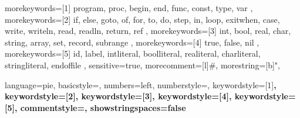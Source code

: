 {
    morekeywords={[1]
        program,
        proc,
        begin,
        end,
        func,
        const,
        type,
        var
    },
    morekeywords={[2]
        if,
        else,
        goto,
        of, %
        for,
        to, %
        do, %
        step, %
        in, %
        loop,
        exitwhen, %
        case,
        write,
        writeln,
        read,
        readln,
        return,
        ref
    },
    morekeywords={[3]
        int,
        bool,
        real,
        char,
        string,
        array,
        set,
        record,
        subrange
    },
    morekeywords={[4]
        true, false, nil
    },
    morekeywords={[5]
        id,
        label,
        intliteral,
        boolliteral,
        realiteral,
        charliteral,
        stringliteral,
        endoffile
    },
    sensitive=true,
    morecomment=[l]{\#},
    morestring=[b]",
}



{
    language=pie,
    basicstyle=\ttfamily,
    numbers=left,
    numberstyle=\tiny,
    keywordstyle=[1]\bfseries\color{keywordcolor},
    keywordstyle=[2]\bfseries\color{keywordcolor},
    keywordstyle=[3]\bfseries\color{keywordcolor},
    keywordstyle=[4]\bfseries\color{literalcolor},
    keywordstyle=[5]\bfseries\color{todefine},
    commentstyle=\color{commentcolor},
    showstringspaces=false
}

\lstset{style=pie}

%
